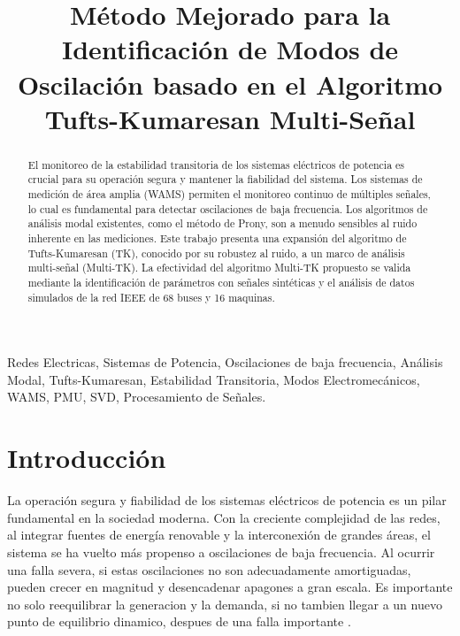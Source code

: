 \documentclass[conference]{IEEEtran}
\begin{document}
\title{Método Mejorado para la Identificación de Modos de Oscilación basado en el Algoritmo Tufts-Kumaresan Multi-Señal}

\author{
}

\maketitle

\begin{abstract}
El monitoreo de la estabilidad transitoria de los sistemas eléctricos de potencia es crucial para su operación segura y mantener la fiabilidad del sistema. Los sistemas de medición de área amplia (WAMS) permiten el monitoreo continuo de múltiples señales, lo cual es fundamental para detectar oscilaciones de baja frecuencia. Los algoritmos de análisis modal existentes, como el método de Prony, son a menudo sensibles al ruido inherente en las mediciones. Este trabajo presenta una expansión del algoritmo de Tufts-Kumaresan (TK), conocido por su robustez al ruido, a un marco de análisis multi-señal (Multi-TK). La efectividad del algoritmo Multi-TK propuesto se valida mediante la identificación de parámetros con señales sintéticas y el análisis de datos simulados de la red IEEE de 68 buses y 16 maquinas.
\end{abstract}

\begin{IEEEkeywords}
Redes Electricas, Sistemas de Potencia, Oscilaciones de baja frecuencia, Análisis Modal, Tufts-Kumaresan, Estabilidad Transitoria, Modos Electromecánicos, WAMS, PMU, SVD, Procesamiento de Señales.
\end{IEEEkeywords}

\section{Introducción}
La operación segura y fiabilidad de los sistemas eléctricos de potencia es un pilar fundamental en la sociedad moderna. Con la creciente complejidad de las redes, al integrar fuentes de energía renovable y la interconexión de grandes áreas, el sistema se ha vuelto más propenso a oscilaciones de baja frecuencia. Al ocurrir una falla severa, si estas oscilaciones no son adecuadamente amortiguadas, pueden crecer en magnitud y desencadenar apagones a gran escala. Es importante no solo reequilibrar la generacion y la demanda, si no tambien llegar a un nuevo punto de equilibrio dinamico, despues de una falla importante \cite{kundur}. 
\end{document}
